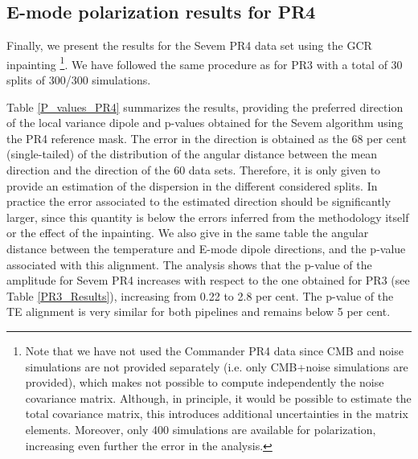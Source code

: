 {\subsection{E-mode polarization results for PR4}\label{PR4_E_Results}

Finally, we present the results for the Sevem PR4 data set using the GCR inpainting \footnote{Note that we have not used the Commander PR4 data since CMB and noise simulations are not provided separately
(i.e. only CMB+noise simulations are provided), which makes not possible to compute independently the noise covariance matrix. 
Although, in principle, it would be possible to estimate the total covariance matrix, this introduces additional uncertainties in the matrix elements. Moreover, only 400 simulations are available for polarization, increasing even further the error in the analysis.}.
We have followed the same procedure as for PR3 with a total of 
30 splits of 300/300 simulations.

Table \ref{P_values_PR4} summarizes the results, providing the preferred direction of the local variance dipole and p-values obtained for the Sevem algorithm using the PR4 reference mask. The error in the direction is obtained as the 68 per cent (single-tailed) of the distribution of the angular distance between the mean direction and the direction of the 60 data sets. Therefore, it is only given to provide an estimation of the dispersion in the different considered splits. In practice the error associated to the estimated direction should be significantly larger, since this quantity is below the errors inferred from the methodology itself or the effect of the inpainting. 
We also give in the same table the angular distance between the temperature and E-mode dipole directions, and the p-value associated with this alignment. The analysis shows that the p-value of the amplitude for Sevem PR4 increases with respect to the one obtained for PR3 (see Table \ref{PR3_Results}), increasing from 0.22 to 2.8 per cent. The p-value of the TE alignment is very similar for both pipelines and remains below 5 per cent.

}
